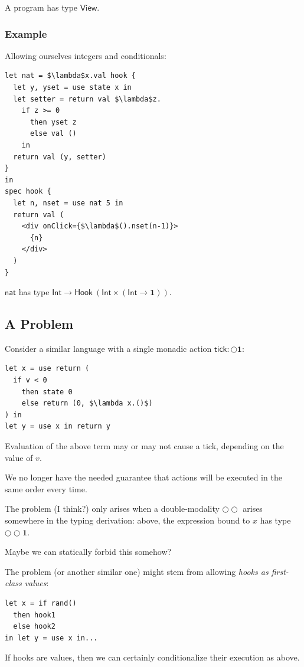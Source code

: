 \documentclass{article}
\newcommand{\mf}[1]{\mathsf{#1}}
\newcommand{\mb}[1]{\mathbf{#1}}
\newcommand{\tone}{\mb{1}}
\begin{document}
A program has type $\mf{View}$.

\subsubsection{Example}

Allowing ourselves integers and conditionals:

\begin{lstlisting}[mathescape]
let nat = $\lambda$x.val hook {
  let y, yset = use state x in
  let setter = return val $\lambda$z.
    if z >= 0
      then yset z
      else val ()
    in
  return val (y, setter)
} 
in
spec hook {
  let n, nset = use nat 5 in
  return val (
    <div onClick={$\lambda$().nset(n-1)}>
      {n}
    </div>
  )
}
\end{lstlisting}

$\mf{nat}$ has type $\mf{Int} \rightarrow 
\mf{Hook}\ (\mf{Int} \times (\mf{Int} \rightarrow \tone))$.

\subsection{A Problem}

Consider a similar language with
a single monadic action $\mf{tick}: \bigcirc \tone$:

\begin{lstlisting}[mathescape]
let x = use return (
  if v < 0
    then state 0
    else return (0, $\lambda x.()$)
) in
let y = use x in return y
\end{lstlisting}

Evaluation of the above term may or may not cause a tick,
depending on the value of $v$.

We no longer have the needed guarantee that
actions will be executed in the same order every time.

The problem (I think?) only arises when
a double-modality $\bigcirc\bigcirc$ arises somewhere in the
typing derivation: above, the expression bound to $x$
has type $\bigcirc\bigcirc\tone$.

Maybe we can statically forbid this somehow?

The problem (or another similar one) might stem from allowing
\emph{hooks as first-class values}:
\begin{lstlisting}[mathescape]
let x = if rand()
  then hook1
  else hook2
in let y = use x in...
\end{lstlisting}
If hooks are values, then we can certainly conditionalize
their execution as above.
\end{document}
